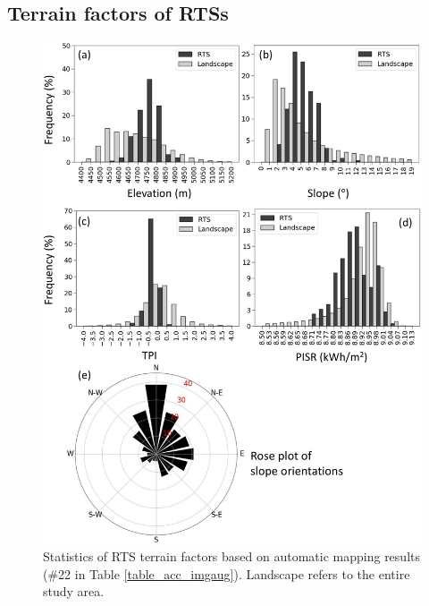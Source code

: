 \documentclass[authoryear,preprint,review,12pt]{elsarticle}
\begin{document}
\subsection{Terrain factors of RTSs}
\label{subsec_terrain}

\begin{figure}
	\centering
	\includegraphics[width=13cm]{figures/terrain_var_fig_mapped_trim.jpg}
	\caption{Statistics of RTS terrain factors based on automatic mapping results  (\#22 in Table \ref{table_acc_imgaug}). Landscape refers to the entire study area.}
	\label{fig_terrain_factors}
\end{figure}
\end{document}
